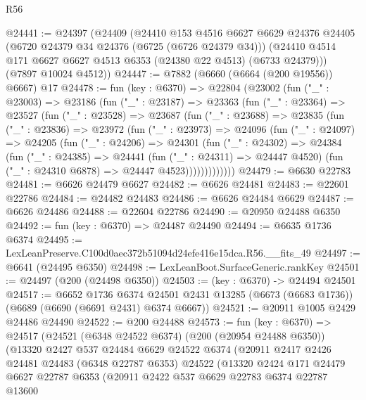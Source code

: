 \begin{lexlean}{R56}
\begin{coremodule}
@24441 := @24397
    (@24409
      (@24410
        @153
        @4516
        @6627
        @6629
        @24376
        @24405
        (@6720 @24379 @34 @24376 (@6725 (@6726 @24379 @34)))
        (@24410 @4514 @171 @6627 @6627 @4513 @6353 (@24380 @22 @4513) (@6733 @24379)))
      (@7897 @10024 @4512))
@24447 := @7882 (@6660 (@6664 (@200 @19556)) @6667) @17
@24478 := fun (key : @6370) =>
  @22804
    (@23002
      (fun ("_" : @23003) =>
      @23186
        (fun ("_" : @23187) =>
        @23363
          (fun ("_" : @23364) =>
          @23527
            (fun ("_" : @23528) =>
            @23687
              (fun ("_" : @23688) =>
              @23835
                (fun ("_" : @23836) =>
                @23972
                  (fun ("_" : @23973) =>
                  @24096
                    (fun ("_" : @24097) =>
                    @24205
                      (fun ("_" : @24206) =>
                      @24301
                        (fun ("_" : @24302) =>
                        @24384
                          (fun ("_" : @24385) =>
                          @24441
                            (fun ("_" : @24311) => @24447 @4520)
                            (fun ("_" : @24310 @6878) => @24447 @4523)))))))))))))
@24479 := @6630 @22783
@24481 := @6626 @24479 @6627
@24482 := @6626 @24481
@24483 := @22601 @22786
@24484 := @24482 @24483
@24486 := @6626 @24484 @6629
@24487 := @6626 @24486
@24488 := @22604 @22786
@24490 := @20950 @24488 @6350
@24492 := fun (key : @6370) => @24487 @24490
@24494 := @6635 @1736 @6374
@24495 := LexLeanPreserve.C100d0aec372b51094d24efe416e15dca.R56.__fits_49
@24497 := @6641 (@24495 @6350)
@24498 := LexLeanBoot.SurfaceGeneric.rankKey
@24501 := @24497 (@200 (@24498 @6350))
@24503 := (key : @6370) -> @24494 @24501
@24517 := @6652
    @1736
    @6374
    @24501
    @2431
    @13285
    (@6673 (@6683 @1736))
    (@6689 (@6690 (@6691 @2431) @6374 @6667))
@24521 := @20911 @1005 @2429 @24486 @24490
@24522 := @200 @24488
@24573 := fun (key : @6370) =>
  @24517
    (@24521
      (@6348 @24522 @6374)
      (@200 (@20954 @24488 @6350))
      (@13320
        @2427
        @537
        @24484
        @6629
        @24522
        @6374
        (@20911
          @2417
          @2426
          @24481
          @24483
          (@6348 @22787 @6353)
          @24522
          (@13320
            @2424
            @171
            @24479
            @6627
            @22787
            @6353
            (@20911
              @2422
              @537
              @6629
              @22783
              @6374
              @22787
              @13600

\end{coremodule}
\end{lexlean}

